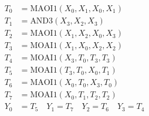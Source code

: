 \documentclass[final,5p,times,twocolumn]{elsarticle}
\begin{document}
\begin{align}
    T_0 & = \text{MAOI1}(X_0, X_1, X_0, X_1) \nonumber          \\
    T_1 & = \text{AND3}(X_3, X_2, X_3) \nonumber                \\
    T_2 & = \text{MAOI1}(X_1, X_2, X_0, X_3) \nonumber          \\
    T_3 & = \text{MOAI1}(X_1, X_0, X_2, X_2) \nonumber          \\
    T_4 & = \text{MOAI1}(X_3, T_0, T_3, T_3) \label{eq2}        \\
    T_5 & = \text{MOAI1}(T_3, T_0, X_0, T_1) \nonumber          \\
    T_6 & = \text{MAOI1}(X_0, T_0, X_3, T_0) \nonumber          \\
    T_7 & = \text{MOAI1}(X_0, T_1, T_2, T_2) \nonumber          \\
    Y_0 & = T_5 \quad Y_1 = T_7 \quad Y_2 = T_6 \quad Y_3 = T_4
    \nonumber
\end{align}
\end{document}
